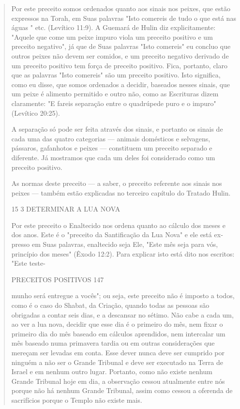 \begin{quote}
Por este preceito somos ordenados quanto aos sinais nos peixes, que
estão expressos na Torah, em Suas palavras "Isto comereis de tudo o que
está nas águas " etc. (Levítico 11:9). A Guemará de Hulin diz
explicitamente: "Aquele que come um peixe impuro viola um preceito
positivo e um preceito negati­vo", já que de Suas palavras "Isto
comereis" eu concluo que outros peixes não devem ser comidos, e um
preceito negativo derivado de um preceito positivo tem força de preceito
positivo. Fica, portanto, claro que as palavras "Isto co­mereis" são um
preceito positivo. Isto significa, como eu disse, que somos or­denados a
decidir, baseados nesses sinais, que um peixe é alimento permitido e
outro não, como as Escrituras dizem claramente: "E fareis separação
entre o quadrúpede puro e o impuro" (Levítico 20:25).

A separação só pode ser feita através dos sinais, e portanto os sinais
de cada uma das quatro categorias --- animais domésticos e selvagens,
pássaros, gafanhotos e peixes --- constituem um preceito separado e
diferente. Já mostra­mos que cada um deles foi considerado como um
preceito positivo.

As normas deste preceito --- a saber, o preceito referente aos sinais
nos peixes --- também estão explicadas no terceiro capítulo do Tratado
Hulin.

15 3 DETERMINAR A LUA NOVA

Por este preceito o Enaltecido nos ordena quanto ao cálculo dos me­ses e
dos anos. Este é o "preceito da Santificação da Lua Nova" e ele está
ex­presso em Suas palavras, enaltecido seja Ele, "Este mês seja para
vós, princípio dos meses" (Êxodo 12:2). Para explicar isto está dito nos
escritos: "Este teste-

PRECEITOS POSITIVOS 147

munho será entregue a vocês"; ou seja, este preceito não é imposto a
todos, como é o caso do Shabat, da Criação, quando todas as pessoas são
obrigadas a contar seis dias, e a descansar no sétimo. Não cabe a cada
um, ao ver a lua nova, decidir que esse dia é o primeiro do mês, nem
fixar o primeiro dia do mês baseado em cálculos aprendidos, nem
intercalar um mês baseado numa primavera tardia ou em outras
considerações que mereçam ser levadas em con­ta. Esse dever nunca deve
ser cumprido por ninguém a não ser o Grande Tri­bunal e deve ser
executado na Terra de Israel e em nenhum outro lugar. Por­tanto, como
não existe nenhum Grande Tribunal hoje em dia, a observação cessou
atualmente entre nós porque não há nenhum Grande Tribunal, assim como
cessou a oferenda de sacrifícios porque o Templo não existe mais.


\end{quote}
